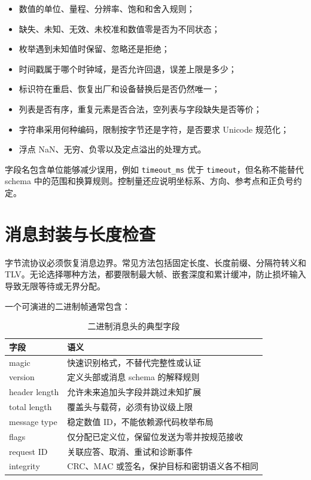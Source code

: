 \begin{itemize}
  \item 数值的单位、量程、分辨率、饱和和舍入规则；
  \item 缺失、未知、无效、未校准和数值零是否为不同状态；
  \item 枚举遇到未知值时保留、忽略还是拒绝；
  \item 时间戳属于哪个时钟域，是否允许回退，误差上限是多少；
  \item 标识符在重启、恢复出厂和设备替换后是否仍然唯一；
  \item 列表是否有序，重复元素是否合法，空列表与字段缺失是否等价；
  \item 字符串采用何种编码，限制按字节还是字符，是否要求 Unicode 规范化；
  \item 浮点 NaN、无穷、负零以及定点溢出的处理方式。
\end{itemize}

字段名包含单位能够减少误用，例如 \texttt{timeout\_ms} 优于 \texttt{timeout}，但名称不能替代 schema 中的范围和换算规则。控制量还应说明坐标系、方向、参考点和正负号约定。

\section{消息封装与长度检查}

字节流协议必须恢复消息边界。常见方法包括固定长度、长度前缀、分隔符转义和 TLV。无论选择哪种方法，都要限制最大帧、嵌套深度和累计缓冲，防止损坏输入导致无限等待或无界分配。

一个可演进的二进制帧通常包含：

\begin{table}[htbp]
  \centering
  \caption{二进制消息头的典型字段}
  \begin{tabular}{p{28mm}p{100mm}}
    \hline
    字段 & 语义 \\
    \hline
    magic & 快速识别格式，不替代完整性或认证 \\
    version & 定义头部或消息 schema 的解释规则 \\
    header length & 允许未来追加头字段并跳过未知扩展 \\
    total length & 覆盖头与载荷，必须有协议级上限 \\
    message type & 稳定数值 ID，不能依赖源代码枚举布局 \\
    flags & 仅分配已定义位，保留位发送为零并按规范接收 \\
    request ID & 关联应答、取消、重试和诊断事件 \\
    integrity & CRC、MAC 或签名，保护目标和密钥语义各不相同 \\
    \hline
  \end{tabular}
\end{table}


